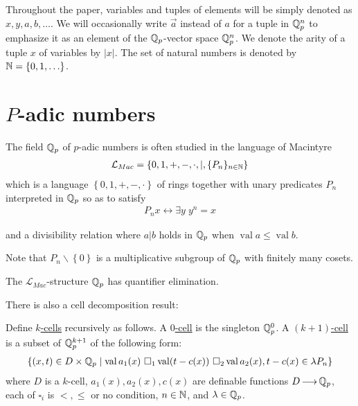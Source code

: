 \documentclass{amsart}
\newcommand{\LLM}{\mathcal L_{Mac}}
\newcommand{\curly}[1]{\left\{#1\right\}}
\DeclareMathOperator{\vval}{val}
\newcommand{\defn}{\ul}
\begin{document}
Throughout the paper, variables and tuples of elements will be simply denoted as $x, y, a, b, \ldots$.
We will occasionally write $\vec a$ instead of $a$ for a tuple in $\mathbb{Q}_p^n$ to emphasize it as an element of the $\mathbb{Q}_p$-vector space $\mathbb{Q}_p^n$.
We denote the arity of a tuple $x$ of variables by $|x|$.
The set of natural numbers is denoted by $\N = \curly{0, 1, \ldots}$.





\section{$P$-adic numbers}


The field $\mathbb{Q}_p$ of $p$-adic numbers is often studied in the language of Macintyre 
  \begin{align*}
	\LLM = \curly{0, 1, +, -, \cdot, |, \{P_n\}_{n \in \N}}
  \end{align*}
which is a language $\curly{0, 1, +, -, \cdot}$ of rings together with unary predicates $P_n$ interpreted in $\mathbb{Q}_p$ so as to satisfy
\begin{align*}
  P_n x \leftrightarrow \exists y \; y^n = x
\end{align*}

and a divisibility relation where $a|b$ holds in $\mathbb{Q}_p$ when $\vval a \leq \vval b$.

Note that $P_n\backslash \curly{0}$ is a multiplicative subgroup of $\mathbb{Q}_p$ with finitely many cosets.

\begin{Theorem} 
  The $\LLM$-structure $\mathbb{Q}_p$ has quantifier elimination.
\end{Theorem}

There is also a cell decomposition result:
\begin{Definition}
  Define \defn{$k$-cells} recursively as follows.
  A \defn{$0$-cell} is the singleton $\mathbb{Q}_p^0$.
  A \defn{$(k+1)$-cell} is a subset of $\mathbb{Q}_p^{k+1}$ of the following form:
  \begin{align*}
    \curly{(x, t) \in D \times \Q_p \mid \vval a_1(x) \ \square_1 \vval (t - c(x)) \ \square_2 \vval a_2(x), t - c(x) \in \lambda P_n}
  \end{align*}
  where $D$ is a $k$-cell,
  $a_1(x), a_2(x), c(x)$ are definable functions $D \operatorname{\longrightarrow} \mathbb{Q}_p$,
  each of $\square_i$ is $<, \leq$ or no condition,
  $n \in \mathbb{N}$,
  and
  $\lambda \in \mathbb{Q}_p$.    
\end{Definition}
\end{document}
